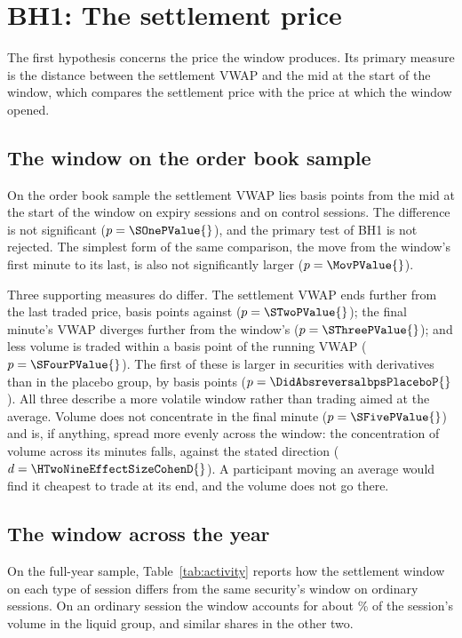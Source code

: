 \section{BH1: The settlement price}\label{sec:bh1}\label{sec:distortion}

The first hypothesis concerns the price the window produces. Its primary measure is the
distance between the settlement VWAP and the mid at the start of the window, which compares the
settlement price with the price at which the window opened.

\subsection{The window on the order book sample}

On the order book sample the settlement VWAP lies \AbsDriftBpsExpiry{} basis points from the
mid at the start of the window on expiry sessions and \AbsDriftBpsControl{} on control sessions. The difference is
not significant ($p = \SOnePValue{}$), and the primary test of BH1 is not rejected. The
simplest form of the same comparison, the move from the window's first minute to its last, is
also not significantly larger ($p = \MovPValue{}$).

Three supporting measures do differ. The settlement VWAP ends further from the last traded
price, \AbsReversalBpsExpiry{} basis points against \AbsReversalBpsControl{}
($p = \STwoPValue{}$); the final minute's VWAP diverges further from the window's
($p = \SThreePValue{}$); and less volume is traded within a basis point of the running VWAP
($p = \SFourPValue{}$). The first of these is larger in securities with derivatives than in
the placebo group, by \DidAbsreversalbpsPlacebo{} basis points
($p = \DidAbsreversalbpsPlaceboP{}$). All three describe a more volatile window rather than
trading aimed at the average. Volume does not concentrate in the final minute
($p = \SFivePValue{}$) and is, if anything, spread more evenly across the window: the
concentration of volume across its minutes falls, against the stated direction
($d = \HTwoNineEffectSizeCohenD{}$). A participant moving an average would find it cheapest to
trade at its end, and the volume does not go there.

\subsection{The window across the year}


On the full-year sample, Table~\ref{tab:activity} reports how the settlement window on each type of session differs
from the same security's window on ordinary sessions. On an ordinary session the window
accounts for about \ActWindowshareLiquidNormal{}\% of the session's volume in the liquid
group, and similar shares in the other two.

